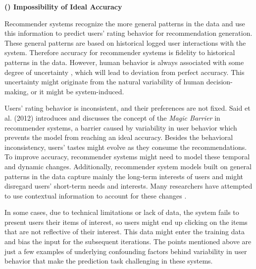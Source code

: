 \vspace{0.25cm}
\noindent \textbf{() Impossibility of Ideal Accuracy}
\vspace{0.25cm}

Recommender systems recognize the more general patterns in the data and use this information to predict users' rating behavior for recommendation generation. These general patterns are based on historical logged user interactions with the system. Therefore accuracy for recommender systems is fidelity to historical patterns in the data. However, human behavior is always associated with some degree of uncertainty \cite{hill1995recommending}, which will lead to deviation from perfect accuracy. This uncertainty might originate from the natural variability of human decision-making, or it might be system-induced.


Users' rating behavior is inconsistent, and their preferences are not fixed. Said et al. (2012) \cite{Said2012MagicBarrier} introduces and discusses the concept of the \textit{Magic Barrier} in recommender systems, a barrier caused by variability in user behavior which prevents the model from reaching an ideal accuracy. Besides the behavioral inconsistency, users' tastes might evolve \cite{McAuley2013expertise} as they consume the recommendations. To improve accuracy, recommender systems might need to model these temporal and dynamic changes. Additionally, recommender system models built on general patterns in the data capture mainly the long-term interests of users and might disregard users' short-term needs and interests. Many researchers have attempted to use contextual information to account for these changes \cite{Adomavicius2011context}.

In some cases, due to technical limitations or lack of data, the system fails to present users their items of interest, so users might end up clicking on the items that are not reflective of their interest. This data might enter the training data and bias the input for the subsequent iterations. The points mentioned above are just a few examples of underlying confounding factors behind variability in user behavior that make the prediction task challenging in these systems.

